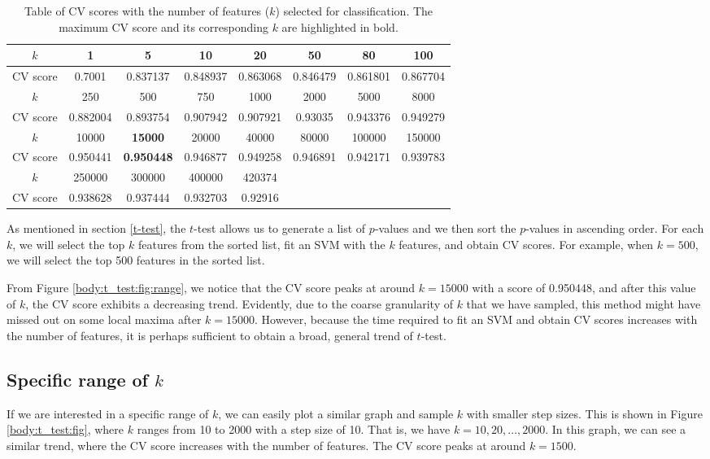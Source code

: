 \documentclass[12pt, twoside, a4paper]{report}
\begin{document}
\begin{table}[h!]
\centering
\begin{tabular}{|c||c|c|c|c|c|c|c|}
\hline
$k$      & 1        & 5        & 10       & 20       & 50       & 80       & 100      \\ \hline
CV score & 0.7001   & 0.837137 & 0.848937 & 0.863068 & 0.846479 & 0.861801 & 0.867704 \\ \hline \hline
$k$      & 250      & 500      & 750      & 1000     & 2000     & 5000     & 8000     \\ \hline
CV score & 0.882004 & 0.893754 & 0.907942 & 0.907921 & 0.93035  & 0.943376 & 0.949279 \\ \hline \hline
$k$      & 10000    & \textbf{15000}    & 20000    & 40000    & 80000    & 100000   & 150000   \\ \hline
CV score & 0.950441 & \textbf{0.950448} & 0.946877 & 0.949258 & 0.946891 & 0.942171 & 0.939783 \\ \hline \hline
$k$      & 250000   & 300000   & 400000   & 420374   &          &          &          \\ \hline
CV score & 0.938628 & 0.937444 & 0.932703 & 0.92916  &          &          &          \\ \hline
\end{tabular}
\caption{Table of CV scores with the number of features ($k$) selected for classification. The maximum CV score and its corresponding $k$ are highlighted in bold.}
\label{t_test:table:range}
\end{table}

As mentioned in section \ref{t-test}, the $t$-test allows us to generate a list of $p$-values and we then sort the $p$-values in ascending order. For each $k$, we will select the top $k$ features from the sorted list, fit an SVM with the $k$ features, and obtain CV scores. For example, when $k=500$, we will select the top 500 features in the sorted list.

From Figure \ref{body:t_test:fig:range}, we notice that the CV score peaks at around $k=15000$ with a score of 0.950448, and after this value of $k$, the CV score exhibits a decreasing trend. Evidently, due to the coarse granularity of $k$ that we have sampled, this method might have missed out on some local maxima after $k=15000$. However, because the time required to fit an SVM and obtain CV scores increases with the number of features, it is perhaps sufficient to obtain a broad, general trend of $t$-test.

\subsection{Specific range of $k$}
If we are interested in a specific range of $k$, we can easily plot a similar graph and sample $k$ with smaller step sizes. This is shown in Figure \ref{body:t_test:fig}, where $k$ ranges from 10 to 2000 with a step size of 10. That is, we have $k=10,20, \dots, 2000$. In this graph, we can see a similar trend, where the CV score increases with the number of features. The CV score peaks at around $k=1500$.
\end{document}
